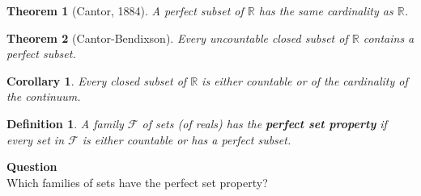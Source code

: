\documentclass{article}
\newcommand{\Real}{\mathbb{R}}
\newtheorem{theorem}{Theorem}[section]
\newtheorem{corollary}{Corollary}[theorem]
\newtheorem{definition}{Definition}[section]
\begin{document}
\begin{frame}
\begin{theorem}[Cantor, 1884]\label{thm-card-perfect-sets}A perfect subset of $\Real$ has the same cardinality as $\Real$.

\end{theorem}\begin{theorem}[Cantor-Bendixson]\label{cantor-bendixson}Every uncountable closed subset of $\Real$ contains a perfect subset.

\end{theorem}\begin{corollary}Every closed subset of $\Real$ is either countable or of the cardinality of the continuum.

\end{corollary}\begin{definition}A family $\mathcal{F}$ of sets (of reals) has the \textbf{perfect set property} if every set in $\mathcal{F}$ is either countable or has a perfect subset.

\end{definition}\begin{framed}
\textbf{Question}\\
Which families of sets have the perfect set property?
\end{framed}

\end{frame}
\end{document}
